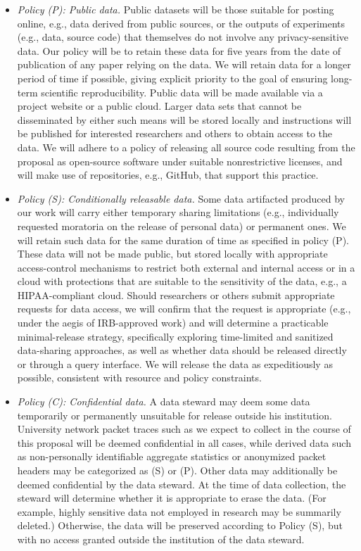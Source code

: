\begin{itemize}

\item{\em Policy (P): Public data.} Public datasets will be those suitable for
posting online, e.g., data derived from public sources, or the outputs of
experiments (e.g., data, source code) that themselves do not involve any
privacy-sensitive data. Our policy will be to retain these data for five years
from the date of publication of any paper relying on the data. We will retain
data for a longer period of time if possible, giving explicit priority to the
goal of ensuring long-term scientific reproducibility. Public data will be made
available via a project website or a public cloud. Larger data sets that cannot
be disseminated by either such means will be stored locally and instructions
will be published for interested researchers and others to obtain access to the
data. We will adhere to a policy of releasing all source code resulting from the
proposal as open-source software under suitable nonrestrictive licenses, and
will make use of repositories, e.g., GitHub, that support this practice.

\item {\em Policy (S): Conditionally releasable data.} Some data artifacted
produced by our work will carry either temporary sharing limitations (e.g.,
individually requested moratoria on the release of personal data) or permanent
ones. We will retain such data for the same duration of time as specified in
policy (P). These data will not be made public, but stored locally with
appropriate access-control mechanisms to restrict both external and internal
access or in a cloud with protections that are suitable to the sensitivity of
the data, e.g., a HIPAA-compliant cloud. Should researchers or others submit
appropriate requests for data access, we will confirm that the request is
appropriate (e.g., under the aegis of IRB-approved work) and will determine a
practicable minimal-release strategy, specifically exploring time-limited and
sanitized data-sharing approaches, as well as whether data should be released
directly or through a query interface. We will release the data as expeditiously
as possible, consistent with resource and policy constraints.

\item {\em Policy (C): Confidential data.} A data steward may deem some data
temporarily or permanently unsuitable for release outside his institution.
University network packet traces such as we expect to collect in the course of
this proposal will be deemed confidential in all cases, while derived data such
as non-personally identifiable aggregate statistics or anonymized packet headers
may be categorized as (S) or (P). Other data may additionally be deemed
confidential by the data steward. At the time of data collection, the steward
will determine whether it is appropriate to erase the data. (For example, highly
sensitive data not employed in research may be summarily deleted.) Otherwise,
the data will be preserved according to Policy (S), but with no access granted
outside the institution of the data steward.


\end{itemize}
